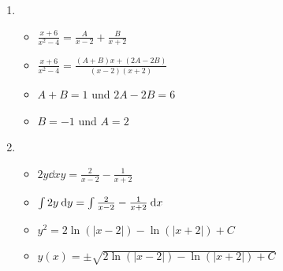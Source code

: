 \item 
\begin{enumerate}

\item
\begin{itemize}
\item $\frac{x+6}{x^2-4} = \frac{A}{x-2}+\frac{B}{x+2}$
\item $\frac{x+6}{x^2-4} = \frac{(A+B)x+(2A-2B)}{(x-2)(x+2)}$
\item $A+B=1$ und $2A-2B=6$
\item $B=-1$ und $A=2$
\end{itemize}

\item 
\begin{itemize}
\item $2y\dd{x}{y} = \frac{2}{x-2} - \frac{1}{x+2}$
\item $\int 2y \:\mathrm{d}{y} = \int \frac{2}{x-2} - \frac{1}{x+2} \:\mathrm{d}{x}$
\item $y^2 = 2\ln(|x-2|) - \ln(|x+2|) + C$
\item $y(x) = \pm \sqrt{2\ln(|x-2|) - \ln(|x+2|) + C}$
\end{itemize}

\end{enumerate}
